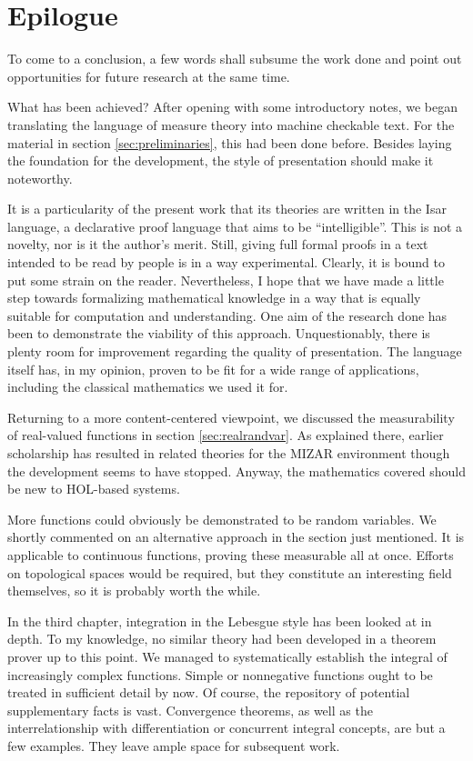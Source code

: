 \chapter{Epilogue}
\label{cha:epilogue}

To come to a conclusion, a few words shall
subsume the work done and point out opportunities for future research at the same time.

What has been achieved? After opening with some
introductory notes, we began translating the language of measure
theory into machine checkable text. For the material in
section \ref{sec:preliminaries}, this had been done before. Besides laying the
foundation for the development, the style of presentation should make it
noteworthy.  

It is a particularity of the present work that its theories are
written in the Isar language, a declarative proof language that aims
to be ``intelligible''. This is not a novelty, nor is it the author's
merit. Still, giving full formal proofs in a text intended to be read
by people is in a way experimental. Clearly, it is bound to put some
strain on the reader. Nevertheless, I hope that we have made a little
step towards formalizing mathematical knowledge in a way that is
equally suitable for computation and understanding. One aim of the
research done has been to demonstrate the viability of this approach.
Unquestionably, there is plenty room for improvement regarding the
quality of presentation. The language itself has, in my opinion,
proven to be fit for a wide range of applications, including the
classical mathematics we used it for.

Returning to a more content-centered viewpoint, we discussed the
measurability of real-valued functions in section \ref{sec:realrandvar}. As
explained there, earlier scholarship has resulted in related theories
for the MIZAR environment though the development seems to have
stopped. Anyway, the mathematics covered should be new to HOL-based
systems. 

More functions could obviously be demonstrated to be random
variables. We shortly commented on an alternative approach in the
section just mentioned. It is applicable to continuous functions,
proving these measurable all at once. Efforts on topological spaces
would be required, but they constitute an interesting field
themselves, so it is probably worth the while.

In the third chapter, integration in the Lebesgue style
has been looked at in depth. To my knowledge, no similar theory had
been developed in a theorem prover up to this point.  We managed to
systematically establish the integral of increasingly complex
functions. Simple or nonnegative functions ought to be treated in
sufficient detail by now. Of course, the repository of potential
supplementary facts is vast. Convergence theorems, as well as the
interrelationship with differentiation or concurrent integral concepts,
are but a few examples. They leave ample space for subsequent work.

